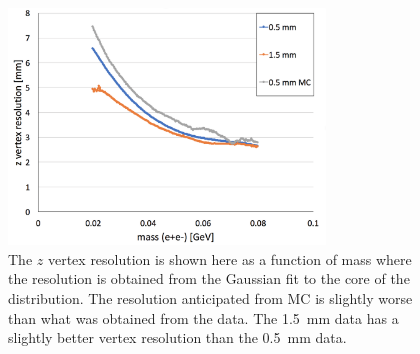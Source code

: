 \begin{figure}[htb]
  \centering
      \includegraphics[width=0.75\textwidth]{pics/results/vtxRes.png}
  \caption[Vertex resolutions as measured in data and compared]{The $z$ vertex resolution is shown here as a function of mass where the resolution is obtained from the Gaussian fit to the core of the distribution. The resolution anticipated from MC is slightly worse than what was obtained from the data. The 1.5~mm data has a slightly better vertex resolution than the 0.5~mm data.}
  \label{fig:vtxRes}
\end{figure}

